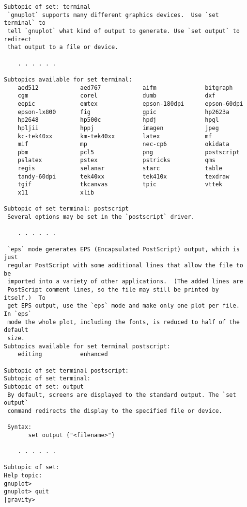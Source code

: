 \begin{small}
\begin{verbatim}
Subtopic of set: terminal
 `gnuplot` supports many different graphics devices.  Use `set terminal` to
 tell `gnuplot` what kind of output to generate. Use `set output` to redirect
 that output to a file or device.

    . . . . . .

Subtopics available for set terminal:
    aed512            aed767            aifm              bitgraph
    cgm               corel             dumb              dxf
    eepic             emtex             epson-180dpi      epson-60dpi
    epson-lx800       fig               gpic              hp2623a
    hp2648            hp500c            hpdj              hpgl
    hpljii            hppj              imagen            jpeg
    kc-tek40xx        km-tek40xx        latex             mf
    mif               mp                nec-cp6           okidata
    pbm               pcl5              png               postscript
    pslatex           pstex             pstricks          qms
    regis             selanar           starc             table
    tandy-60dpi       tek40xx           tek410x           texdraw
    tgif              tkcanvas          tpic              vttek
    x11               xlib

Subtopic of set terminal: postscript
 Several options may be set in the `postscript` driver.

    . . . . . .

 `eps` mode generates EPS (Encapsulated PostScript) output, which is just
 regular PostScript with some additional lines that allow the file to be
 imported into a variety of other applications.  (The added lines are
 PostScript comment lines, so the file may still be printed by itself.)  To
 get EPS output, use the `eps` mode and make only one plot per file.  In `eps`
 mode the whole plot, including the fonts, is reduced to half of the default
 size.
Subtopics available for set terminal postscript:
    editing           enhanced

Subtopic of set terminal postscript: 
Subtopic of set terminal: 
Subtopic of set: output
 By default, screens are displayed to the standard output. The `set output`
 command redirects the display to the specified file or device.

 Syntax:
       set output {"<filename>"}

    . . . . . .

Subtopic of set: 
Help topic: 
gnuplot> 
gnuplot> quit
|gravity> 
\end{verbatim}
\end{small}

